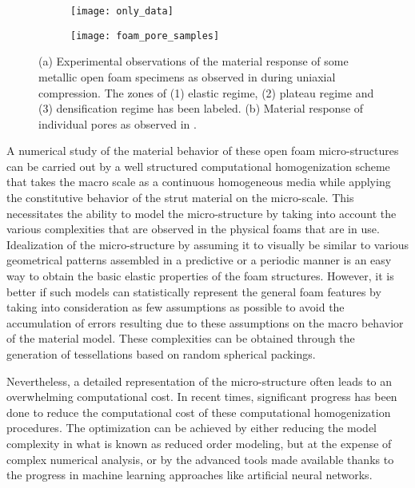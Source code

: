 \begin{figure}
	\centering
	\begin{subfigure}{0.45\textwidth}
		\texttt{[image: only\_data]}
		\caption{}
	\end{subfigure}
	\begin{subfigure}{0.45\textwidth}
	\texttt{[image: foam\_pore\_samples]}
	\caption{}
	\end{subfigure}
	\caption{(a) Experimental observations of the material response of some metallic open foam specimens as observed in \cite{jungMicrostructuralCharacterisationExperimental2017} during uniaxial compression. The zones of (1) elastic regime, (2) plateau regime and (3) densification regime has been labeled. (b) Material response of individual pores as observed in \cite{heinzeExperimentalNumericalInvestigation2018}. }\label{fig-int-sample}
\end{figure}

A numerical study of the material behavior of these open foam micro-structures can be carried out by a well structured computational homogenization scheme that takes the macro scale as a continuous homogeneous media while applying the constitutive behavior of the strut material on the micro-scale. This necessitates the ability to model the micro-structure by taking into account the various complexities that are observed in the physical foams that are in use. Idealization of the micro-structure by assuming it to visually be similar to various geometrical patterns assembled in a predictive or a periodic manner is an easy way to obtain the basic elastic properties of the foam structures. However, it is better if such models can statistically represent the general foam features by taking into consideration as few assumptions as possible to avoid the accumulation of errors resulting due to these assumptions on the macro behavior of the material model. These complexities can be obtained through the generation of tessellations based on random spherical packings.

Nevertheless, a detailed representation of the micro-structure often leads to an overwhelming computational cost. In recent times, significant progress has been done to reduce the computational cost of these computational homogenization procedures. The optimization can be achieved by either reducing the model complexity in what is known as reduced order modeling, but at the expense of complex numerical analysis, or by the advanced tools made available thanks to the progress in machine learning approaches like artificial neural networks. 

